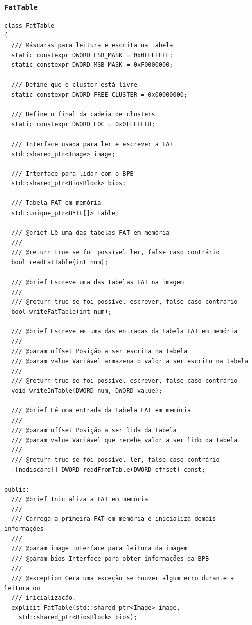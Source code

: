 \documentclass[
    12pt,				%
    oneside,   	        %
    a4paper,			%
    english,			%
    french,				%
    spanish,			%
    brazil,				%
    ]{pacotes/abntex2}
\begin{document}
\subsubsection{\texttt{FatTable}}
\label{subsubsec:fat_table}

\begin{lstlisting}[caption={Classe a estrutura FAT}, label={lst:fat_table}]
class FatTable
{
  /// Máscaras para leitura e escrita na tabela
  static constexpr DWORD LSB_MASK = 0x0FFFFFFF;
  static constexpr DWORD MSB_MASK = 0xF0000000;

  /// Define que o cluster está livre
  static constexpr DWORD FREE_CLUSTER = 0x00000000;

  /// Define o final da cadeia de clusters
  static constexpr DWORD EOC = 0x0FFFFFF8;

  /// Interface usada para ler e escrever a FAT
  std::shared_ptr<Image> image;

  /// Interface para lidar com o BPB
  std::shared_ptr<BiosBlock> bios;

  /// Tabela FAT em memória
  std::unique_ptr<BYTE[]> table;

  /// @brief Lê uma das tabelas FAT em memória
  ///
  /// @return true se foi possível ler, false caso contrário
  bool readFatTable(int num);

  /// @brief Escreve uma das tabelas FAT na imagem
  ///
  /// @return true se foi possível escrever, false caso contrário
  bool writeFatTable(int num);

  /// @brief Escreve em uma das entradas da tabela FAT em memória
  ///
  /// @param offset Posição a ser escrita na tabela
  /// @param value Variável armazena o valor a ser escrito na tabela
  ///
  /// @return true se foi possível escrever, false caso contrário
  void writeInTable(DWORD num, DWORD value);

  /// @brief Lê uma entrada da tabela FAT em memória
  ///
  /// @param offset Posição a ser lida da tabela
  /// @param value Variável que recebe valor a ser lido da tabela
  ///
  /// @return true se foi possível ler, false caso contrário
  [[nodiscard]] DWORD readFromTable(DWORD offset) const;

public:
  /// @brief Inicializa a FAT em memória
  ///
  /// Carrega a primeira FAT em memória e inicializa demais informações
  ///
  /// @param image Interface para leitura da imagem
  /// @param bios Interface para obter informações da BPB
  ///
  /// @exception Gera uma exceção se houver algum erro durante a leitura ou
  /// inicialização.
  explicit FatTable(std::shared_ptr<Image> image,
    std::shared_ptr<BiosBlock> bios);


\end{lstlisting}
\end{document}

